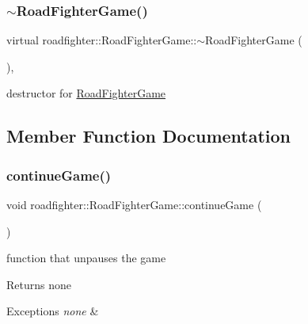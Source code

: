 \subsubsection{\texorpdfstring{$\sim$\+Road\+Fighter\+Game()}{~RoadFighterGame()}}
{\footnotesize\ttfamily virtual roadfighter\+::\+Road\+Fighter\+Game\+::$\sim$\+Road\+Fighter\+Game (\begin{DoxyParamCaption}{ }\end{DoxyParamCaption})\hspace{0.3cm}{\ttfamily [virtual]}, {\ttfamily [default]}}

destructor for \hyperlink{classroadfighter_1_1RoadFighterGame}{Road\+Fighter\+Game} 

\subsection{Member Function Documentation}
\mbox{\label{classroadfighter_1_1RoadFighterGame_a2fbb9632b4e3e143486cfef5f06c17a1}} 
\subsubsection{\texorpdfstring{continue\+Game()}{continueGame()}}
{\footnotesize\ttfamily void roadfighter\+::\+Road\+Fighter\+Game\+::continue\+Game (\begin{DoxyParamCaption}{ }\end{DoxyParamCaption})}

function that unpauses the game \begin{DoxyReturn}{Returns}
none 
\end{DoxyReturn}

\begin{DoxyExceptions}{Exceptions}
{\em none} & \\
\hline
\end{DoxyExceptions}
\mbox{\label{classroadfighter_1_1RoadFighterGame_a404d5a9afcad9e907ffd7edb589ae6cd}} 
